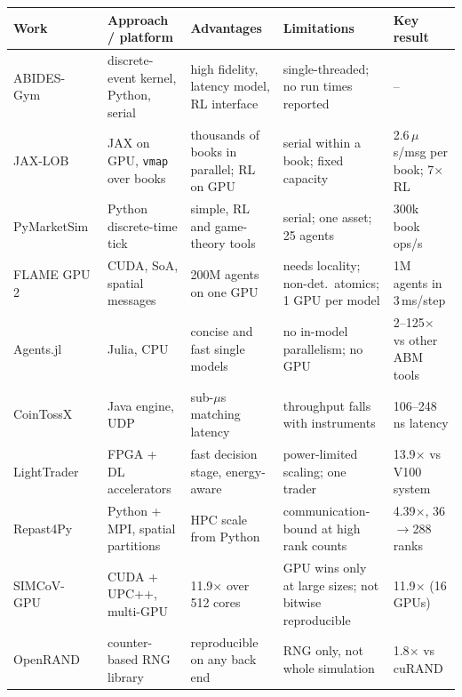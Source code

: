 \begin{widetable}
\centering
\caption{Comparison of recent related work (2021--2024).}
\label{tab:lit}
\footnotesize
\begin{tabularx}{\textwidth}{@{}p{2.3cm} X X X p{2.0cm}@{}}
\toprule
Work & Approach / platform & Advantages & Limitations & Key result\\
\midrule
ABIDES-Gym~\cite{amrouni2021} & discrete-event kernel, Python, serial & high fidelity, latency model, RL interface & single-threaded; no run times reported & --\\
JAX-LOB~\cite{frey2023} & JAX on GPU, \texttt{vmap} over books & thousands of books in parallel; RL on GPU & serial within a book; fixed capacity & 2.6\,$\mu$s/msg per book; 7$\times$ RL\\
PyMarketSim~\cite{mascioli2024} & Python discrete-time tick & simple, RL and game-theory tools & serial; one asset; 25 agents & 300k book ops/s\\
FLAME GPU 2~\cite{richmond2023} & CUDA, SoA, spatial messages & 200M agents on one GPU & needs locality; non-det.\ atomics; 1 GPU per model & 1M agents in 3\,ms/step\\
Agents.jl~\cite{datseris2024} & Julia, CPU & concise and fast single models & no in-model parallelism; no GPU & 2--125$\times$ vs other ABM tools\\
CoinTossX~\cite{jericevich2022} & Java engine, UDP & sub-$\mu$s matching latency & throughput falls with instruments & 106--248\,ns latency\\
LightTrader~\cite{yoo2023} & FPGA + DL accelerators & fast decision stage, energy-aware & power-limited scaling; one trader & 13.9$\times$ vs V100 system\\
Repast4Py~\cite{collier2022} & Python + MPI, spatial partitions & HPC scale from Python & communication-bound at high rank counts & 4.39$\times$, 36$\to$288 ranks\\
SIMCoV-GPU~\cite{leyba2024} & CUDA + UPC++, multi-GPU & 11.9$\times$ over 512 cores & GPU wins only at large sizes; not bitwise reproducible & 11.9$\times$ (16 GPUs)\\
OpenRAND~\cite{khan2024} & counter-based RNG library & reproducible on any back end & RNG only, not whole simulation & 1.8$\times$ vs cuRAND\\
\bottomrule
\end{tabularx}
\end{widetable}
